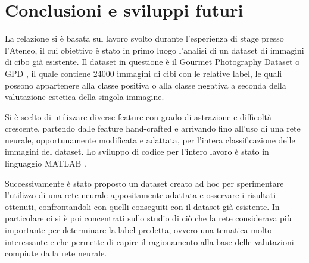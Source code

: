 \chapter{Conclusioni e sviluppi futuri}
\label{sviluppi}

\begin{comment}
\begin{itemize}
\item riportare parte dell'intro, spiegando l'obiettivo 
\item immagini negative più semplici da valutare, su quelle positive c'è più discordanza tra gli utenti
\item si conferma che l'estetica è una caratteristica molto soggettiva e piuttosto complessa da descrivere con dei modelli
\item ipotetici sviluppi futuri: possibile ampliamento del mio dataset e ampliamento dei 41 utenti, i quali dovranno anche motivare le risposte in modo più esaustivo possibile, in modo tale da avere più opinioni così come è stato fatto nel Paper \cite{sheng2021learning}
\end{itemize}
\end{comment}

La relazione si è basata sul lavoro svolto durante l'esperienza di stage presso l'Ateneo, il cui obiettivo è stato in primo luogo l'analisi di un dataset di immagini di cibo già esistente. Il dataset in questione è il Gourmet Photography Dataset o GPD \cite{sheng2021learning}, il quale contiene 24000 immagini di cibi con le relative label, le quali possono appartenere alla classe positiva o alla classe negativa a seconda della valutazione estetica della singola immagine.

Si è scelto di utilizzare diverse feature con grado di astrazione e difficoltà crescente, partendo dalle feature hand-crafted e arrivando fino all'uso di una rete neurale, opportunamente modificata e adattata, per l'intera classificazione delle immagini del dataset. Lo sviluppo di codice per l'intero lavoro è stato in linguaggio MATLAB \cite{MATLAB}.

Successivamente è stato proposto un dataset creato ad hoc per sperimentare l'utilizzo di una rete neurale appositamente adattata e osservare i risultati ottenuti, confrontandoli con quelli conseguiti con il dataset già esistente. In particolare ci si è poi concentrati sullo studio di ciò che la rete considerava più importante per determinare la label predetta, ovvero una tematica molto interessante e che permette di capire il ragionamento alla base delle valutazioni compiute dalla rete neurale.

